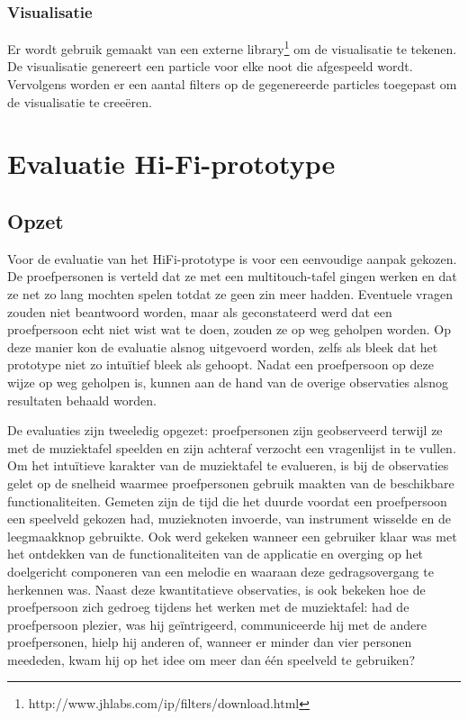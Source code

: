 \documentclass{acm}
\begin{document}
\subsubsection{Visualisatie}
Er wordt gebruik gemaakt van een externe library\footnote{http://www.jhlabs.com/ip/filters/download.html} om de visualisatie te tekenen. De visualisatie genereert een particle voor elke noot die afgespeeld wordt. Vervolgens worden er een aantal filters op de gegenereerde particles toegepast om de visualisatie te creeëren.

\section{Evaluatie Hi-Fi-prototype}
\label{sec_evaluatie}

\subsection{Opzet}
Voor de evaluatie van het HiFi-prototype is voor een eenvoudige aanpak gekozen. De proefpersonen is verteld dat ze met een multitouch-tafel gingen werken en dat ze net zo lang mochten spelen totdat ze geen zin meer hadden. Eventuele vragen zouden niet beantwoord worden, maar als geconstateerd werd dat een proefpersoon echt niet wist wat te doen, zouden ze op weg geholpen worden. Op deze manier kon de evaluatie alsnog uitgevoerd worden, zelfs als bleek dat het prototype niet zo intu\"itief bleek als gehoopt. Nadat een proefpersoon op deze wijze op weg geholpen is, kunnen aan de hand van de overige observaties alsnog resultaten behaald worden.

De evaluaties zijn tweeledig opgezet: proefpersonen zijn geobserveerd terwijl ze met de muziektafel speelden en zijn achteraf verzocht een vragenlijst in te vullen. Om het intu\"itieve karakter van de muziektafel te evalueren, is bij de observaties gelet op de snelheid waarmee proefpersonen gebruik maakten van de beschikbare functionaliteiten. Gemeten zijn de tijd die het duurde voordat een proefpersoon een speelveld gekozen had, muzieknoten invoerde, van instrument wisselde en de leegmaakknop gebruikte. Ook werd gekeken wanneer een gebruiker klaar was met het ontdekken van de functionaliteiten van de applicatie en overging op het doelgericht componeren van een melodie en waaraan deze gedragsovergang te herkennen was. Naast deze kwantitatieve observaties, is ook bekeken hoe de proefpersoon zich gedroeg tijdens het werken met de muziektafel: had de proefpersoon plezier, was hij ge\"intrigeerd, communiceerde hij met de andere proefpersonen, hielp hij anderen of, wanneer er minder dan vier personen meededen, kwam hij op het idee om meer dan \'e\'en speelveld te gebruiken?
\end{document}
